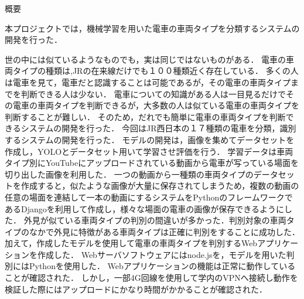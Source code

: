 

\begin{center}
		{\gtfamily \Large 概要}
\end{center}
\vspace{1cm}
\thispagestyle{empty}	



本プロジェクトでは，機械学習を用いた電車の車両タイプを分類するシステムの開発を行った．

世の中には似ているようなものでも，実は同じではないものがある．
電車の車両タイプの種類は,JRの在来線だけでも１００種類近く存在している．
多くの人は電車を見て，電車だと認識することは可能であるが，その電車の車両タイプまでを判断できる人は少ない．
電車についての知識がある人は一目見るだけでその電車の車両タイプを判断できるが，大多数の人は似ている電車の車両タイプを判断することが難しい．
そのため，だれでも簡単に電車の車両タイプを判断できるシステムの開発を行った．
今回はJR西日本の１７種類の電車を分類，識別するシステムの開発を行った．
モデルの開発は，画像を集めてデータセットを作成し，YOLOとデータセット用いて学習させ評価を行う．
学習データは車両タイプ別にYouTubeにアップロードされている動画から電車が写っている場面を切り出した画像を利用した．
一つの動画から一種類の車両タイプのデータセットを作成すると，似たような画像が大量に保存されてしまうため，複数の動画の任意の場面を連結して一本の動画にするシステムをPythonのフレームワークであるDjangoを利用して作成し，様々な場面の電車の画像が保存できるようにした．
外見が似ている車両タイプの判別の間違いが多かった．判別対象の車両タイプのなかで外見に特徴がある車両タイプは正確に判別をすることに成功した．
加えて，作成したモデルを使用して電車の車両タイプを判別するWebアプリケーションを作成した．
Webサーバソフトウェアにはnode.jsを，モデルを用いた判別にはPythonを使用した．
Webアプリケーションの機能は正常に動作していることが確認された．
しかし，一部4G回線を使用して学内のVPNへ接続し動作を検証した際にはアップロードにかなり時間がかかることが確認された．

\clearpage
